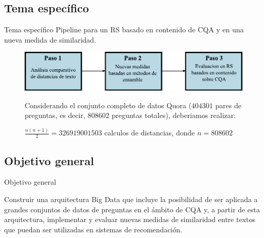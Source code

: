 \subsection{Tema específico}
\begin{frame}[allowframebreaks]{Tema específico}
	Pipeline para un RS basado en contenido de CQA y en una nueva medida de similaridad.
	\medskip
	\begin{figure}
		\centering
		\includegraphics[width=0.7\linewidth]{../5_introduccion/imagenes/pipeline}
		\label{fig:pipeline}

		\framebreak

		Considerando el conjunto completo de datos Quora (\(404301\) pares de preguntas, es decir, \(808602\) preguntas totales), deberiamos realizar:

		\bigskip $\frac{n(n+1)}{2} = 326919001503$ calculos de distancias, donde $n = 808602$
	\end{figure}
\end{frame}

\subsection{Objetivo general}
\begin{frame}{Objetivo general}
	\begin{tcolorbox}[colback=blue!5,colframe=blue!40!black,title=Objetivo general]
		Construir una arquitectura Big Data que incluye la posibilidad de ser aplicada a grandes conjuntos de datos de preguntas en el ámbito de CQA y, a partir de esta arquitectura, implementar y evaluar nuevas medidas de similaridad entre textos que puedan ser utilizadas en sistemas de recomendación.
	\end{tcolorbox}
\end{frame}

